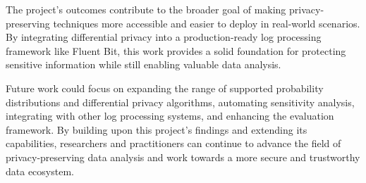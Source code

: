 The project's outcomes contribute to the broader goal of making privacy-preserving techniques more accessible and easier to deploy in real-world scenarios. By integrating differential privacy into a production-ready log processing framework like Fluent Bit, this work provides a solid foundation for protecting sensitive information while still enabling valuable data analysis.

Future work could focus on expanding the range of supported probability distributions and differential privacy algorithms, automating sensitivity analysis, integrating with other log processing systems, and enhancing the evaluation framework. By building upon this project's findings and extending its capabilities, researchers and practitioners can continue to advance the field of privacy-preserving data analysis and work towards a more secure and trustworthy data ecosystem.